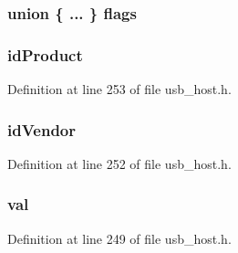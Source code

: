 \subsubsection[{flags}]{\setlength{\rightskip}{0pt plus 5cm}union \{ ... \}   flags}\label{struct___u_s_b___t_p_l_a434dc72c7e0a6e7a57c7386fba65f749}
\hypertarget{struct___u_s_b___t_p_l_ac5fdd724b5bba710af6f437f19467636}{}
\subsubsection[{id\+Product}]{ id\+Product}\label{struct___u_s_b___t_p_l_ac5fdd724b5bba710af6f437f19467636}


Definition at line 253 of file usb\+\_\+host.\+h.

\hypertarget{struct___u_s_b___t_p_l_aa6705f738420468e35fa0bcc980ef1d8}{}
\subsubsection[{id\+Vendor}]{ id\+Vendor}\label{struct___u_s_b___t_p_l_aa6705f738420468e35fa0bcc980ef1d8}


Definition at line 252 of file usb\+\_\+host.\+h.

\hypertarget{struct___u_s_b___t_p_l_a5a7eddd9a55e78e10170062484c8c52a}{}
\subsubsection[{val}]{ val}\label{struct___u_s_b___t_p_l_a5a7eddd9a55e78e10170062484c8c52a}


Definition at line 249 of file usb\+\_\+host.\+h.

\hypertarget{struct___u_s_b___t_p_l_a5986ea8162aa0f6608b36b20964044dd}{}
